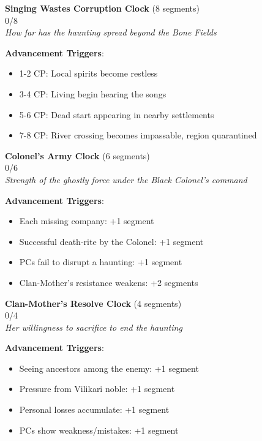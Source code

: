 \documentclass[11pt]{article}
\newcommand{\clocksegment}{\textbullet}
\begin{document}
\begin{center}
\textbf{Singing Wastes Corruption Clock} (8 segments)\\
\fbox{\clocksegment\clocksegment\clocksegment\clocksegment\clocksegment\clocksegment\clocksegment\clocksegment} 0/8\\
\textit{How far has the haunting spread beyond the Bone Fields}
\end{center}

\textbf{Advancement Triggers}:
\begin{itemize}[leftmargin=*]
\item 1-2 CP: Local spirits become restless
\item 3-4 CP: Living begin hearing the songs
\item 5-6 CP: Dead start appearing in nearby settlements
\item 7-8 CP: River crossing becomes impassable, region quarantined
\end{itemize}

\begin{center}
\textbf{Colonel's Army Clock} (6 segments)\\
\fbox{\clocksegment\clocksegment\clocksegment\clocksegment\clocksegment\clocksegment} 0/6\\
\textit{Strength of the ghostly force under the Black Colonel's command}
\end{center}

\textbf{Advancement Triggers}:
\begin{itemize}[leftmargin=*]
\item Each missing company: +1 segment
\item Successful death-rite by the Colonel: +1 segment
\item PCs fail to disrupt a haunting: +1 segment
\item Clan-Mother's resistance weakens: +2 segments
\end{itemize}

\begin{center}
\textbf{Clan-Mother's Resolve Clock} (4 segments)\\
\fbox{\clocksegment\clocksegment\clocksegment\clocksegment} 0/4\\
\textit{Her willingness to sacrifice to end the haunting}
\end{center}

\textbf{Advancement Triggers}:
\begin{itemize}[leftmargin=*]
\item Seeing ancestors among the enemy: +1 segment
\item Pressure from Vilikari noble: +1 segment
\item Personal losses accumulate: +1 segment
\item PCs show weakness/mistakes: +1 segment
\end{itemize}
\end{document}
